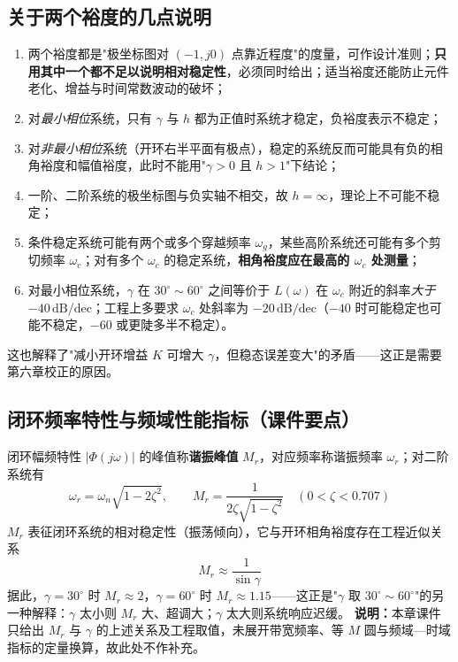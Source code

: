 \subsection{关于两个裕度的几点说明}
\begin{enumerate}
    \item 两个裕度都是"极坐标图对 $(-1,j0)$ 点靠近程度"的度量，可作设计准则；\textbf{只用其中一个都不足以说明相对稳定性}，必须同时给出；适当裕度还能防止元件老化、增益与时间常数波动的破坏；
    \item 对\emph{最小相位}系统，只有 $\gamma$ 与 $h$ 都为正值时系统才稳定，负裕度表示不稳定；
    \item 对\emph{非最小相位}系统（开环右半平面有极点），稳定的系统反而可能具有负的相角裕度和幅值裕度，此时不能用"$\gamma>0$ 且 $h>1$"下结论；
    \item 一阶、二阶系统的极坐标图与负实轴不相交，故 $h=\infty$，理论上不可能不稳定；
    \item 条件稳定系统可能有两个或多个穿越频率 $\omega_g$，某些高阶系统还可能有多个剪切频率 $\omega_c$；对有多个 $\omega_c$ 的稳定系统，\textbf{相角裕度应在最高的 $\omega_c$ 处测量}；
    \item 对最小相位系统，$\gamma$ 在 $30^\circ\sim60^\circ$ 之间等价于 $L(\omega)$ 在 $\omega_c$ 附近的斜率\emph{大于} $-40\,\mathrm{dB/dec}$；工程上多要求 $\omega_c$ 处斜率为 $-20\,\mathrm{dB/dec}$（$-40$ 时可能稳定也可能不稳定，$-60$ 或更陡多半不稳定）。
\end{enumerate}
\noindent 这也解释了"减小开环增益 $K$ 可增大 $\gamma$，但稳态误差变大"的矛盾——这正是需要第六章校正的原因。

\subsection{闭环频率特性与频域性能指标（课件要点）}
闭环幅频特性 $|\Phi(j\omega)|$ 的峰值称\textbf{谐振峰值} $M_r$，对应频率称谐振频率 $\omega_r$；对二阶系统有
\[
\omega_r=\omega_n\sqrt{1-2\zeta^2},\qquad M_r=\frac{1}{2\zeta\sqrt{1-\zeta^2}}\quad(0<\zeta<0.707)
\]
$M_r$ 表征闭环系统的相对稳定性（振荡倾向），它与开环相角裕度存在工程近似关系
\[
M_r\approx\frac{1}{\sin\gamma}
\]
据此，$\gamma=30^\circ$ 时 $M_r\approx2$，$\gamma=60^\circ$ 时 $M_r\approx1.15$——这正是"$\gamma$ 取 $30^\circ\sim60^\circ$"的另一种解释：$\gamma$ 太小则 $M_r$ 大、超调大；$\gamma$ 太大则系统响应迟缓。
\noindent\textbf{说明：}本章课件只给出 $M_r$ 与 $\gamma$ 的上述关系及工程取值，未展开带宽频率、等 $M$ 圆与频域—时域指标的定量换算，故此处不作补充。

\bigskip

